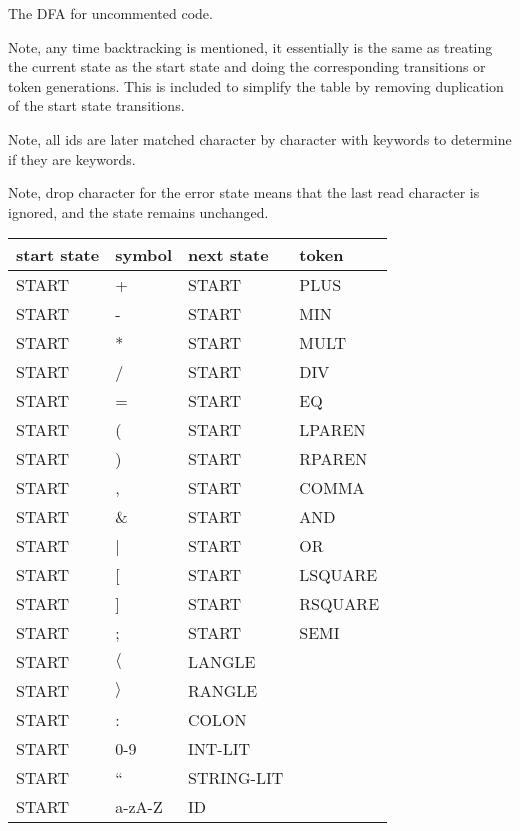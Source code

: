 \documentclass[11pt, fleqn]{article}
\begin{document}
The DFA for uncommented code.

Note, any time backtracking is mentioned, it essentially is the same as treating the current state as the start state and doing the corresponding transitions or token generations. This is included to simplify the table by removing duplication of the start state transitions.

Note, all ids are later matched character by character with keywords to determine if they are keywords.

Note, drop character for the error state means that the last read character is ignored, and the state remains unchanged.

\begin{longtable}{l|l|l|l}
start state		&	symbol						&	next	 state		&	token		 		\\
\hline
START			&	+								&	START			&	PLUS					\\
START			&	-								&	START			&	MIN					\\
START			&	*								&	START			&	MULT					\\
START			&	/								&	START			&	DIV					\\
START			&	=								&	START			&	EQ					\\
START			&	(								&	START			&	LPAREN				\\
START			&	)								&	START			&	RPAREN				\\
START			&	,								&	START			&	COMMA				\\
START			&	\&								&	START			&	AND					\\
START			&	|								&	START			&	OR					\\
START			&	[								&	START			&	LSQUARE				\\
START			&	]								&	START			&	RSQUARE				\\
START			&	;								&	START			&	SEMI					\\
START			&	$\langle$						&	LANGLE			&						\\
START			&	$\rangle$						&	RANGLE			&						\\
START			&	:								&	COLON			&						\\
START			&	0-9								&	INT-LIT			&						\\
START			&	``								&	STRING-LIT		&						\\
START			&	a-zA-Z							&	ID				&						\\

\end{longtable}
\end{document}
